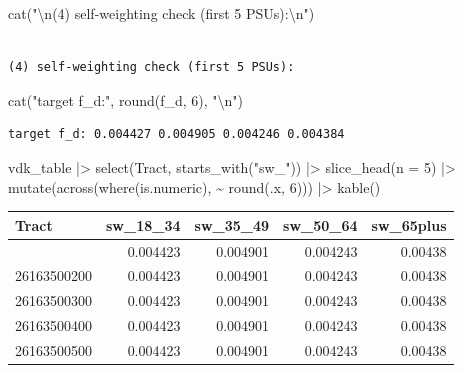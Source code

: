 \documentclass[
  11pt,
]{article}
\newenvironment{Shaded}{\begin{snugshade}}{\end{snugshade}}
\newcommand{\AttributeTok}[1]{\textcolor[rgb]{0.40,0.45,0.13}{#1}}
\newcommand{\DecValTok}[1]{\textcolor[rgb]{0.68,0.00,0.00}{#1}}
\newcommand{\FunctionTok}[1]{\textcolor[rgb]{0.28,0.35,0.67}{#1}}
\newcommand{\NormalTok}[1]{\textcolor[rgb]{0.00,0.23,0.31}{#1}}
\newcommand{\SpecialCharTok}[1]{\textcolor[rgb]{0.37,0.37,0.37}{#1}}
\newcommand{\StringTok}[1]{\textcolor[rgb]{0.13,0.47,0.30}{#1}}
\begin{document}
\begin{Shaded}
\begin{Highlighting}[]
\FunctionTok{cat}\NormalTok{(}\StringTok{"}\SpecialCharTok{\textbackslash{}n}\StringTok{(4) self{-}weighting check (first 5 PSUs):}\SpecialCharTok{\textbackslash{}n}\StringTok{"}\NormalTok{)}
\end{Highlighting}
\end{Shaded}

\begin{verbatim}

(4) self-weighting check (first 5 PSUs):
\end{verbatim}

\begin{Shaded}
\begin{Highlighting}[]
\FunctionTok{cat}\NormalTok{(}\StringTok{"target f\_d:"}\NormalTok{, }\FunctionTok{round}\NormalTok{(f\_d, }\DecValTok{6}\NormalTok{), }\StringTok{"}\SpecialCharTok{\textbackslash{}n}\StringTok{"}\NormalTok{)}
\end{Highlighting}
\end{Shaded}

\begin{verbatim}
target f_d: 0.004427 0.004905 0.004246 0.004384 
\end{verbatim}

\begin{Shaded}
\begin{Highlighting}[]
\NormalTok{vdk\_table }\SpecialCharTok{|\textgreater{}} \FunctionTok{select}\NormalTok{(Tract, }\FunctionTok{starts\_with}\NormalTok{(}\StringTok{"sw\_"}\NormalTok{)) }\SpecialCharTok{|\textgreater{}}
  \FunctionTok{slice\_head}\NormalTok{(}\AttributeTok{n =} \DecValTok{5}\NormalTok{) }\SpecialCharTok{|\textgreater{}}
  \FunctionTok{mutate}\NormalTok{(}\FunctionTok{across}\NormalTok{(}\FunctionTok{where}\NormalTok{(is.numeric), }\SpecialCharTok{\textasciitilde{}} \FunctionTok{round}\NormalTok{(.x, }\DecValTok{6}\NormalTok{))) }\SpecialCharTok{|\textgreater{}} \FunctionTok{kable}\NormalTok{()}
\end{Highlighting}
\end{Shaded}

\begin{longtable}[]{@{}lrrrr@{}}
\toprule\noalign{}
Tract & sw\_18\_34 & sw\_35\_49 & sw\_50\_64 & sw\_65plus \\
\midrule\noalign{}
\endhead
\bottomrule\noalign{}
\endlastfoot
26163500100 & 0.004423 & 0.004901 & 0.004243 & 0.00438 \\
26163500200 & 0.004423 & 0.004901 & 0.004243 & 0.00438 \\
26163500300 & 0.004423 & 0.004901 & 0.004243 & 0.00438 \\
26163500400 & 0.004423 & 0.004901 & 0.004243 & 0.00438 \\
26163500500 & 0.004423 & 0.004901 & 0.004243 & 0.00438 \\
\end{longtable}
\end{document}
